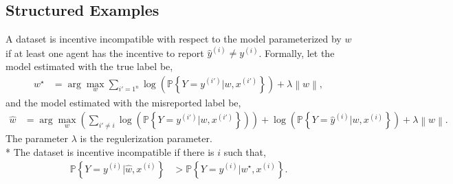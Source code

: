 \documentclass{article}
\begin{document}
\subsection{Structured Examples}
A dataset is incentive incompatible with respect to the model parameterized by $w $ if at least one agent has the incentive to report $\hat{y} ^{\left(i\right)} \neq  y^{\left(i\right)}$. Formally, let the model estimated with the true label be,
\begin{align*}
w^\star  &= \arg\displaystyle\max_{w} \displaystyle\sum_{i'=1^{n}} \log\left(\mathbb{P}\left\{Y = y^{\left(i'\right)} | w, x^{\left(i'\right)}\right\}\right) + \lambda \left\|w\right\|,
\end{align*}
and the model estimated with the misreported label be,
\begin{align*}
\hat{w} &= \arg\displaystyle\max_{w} \left(\displaystyle\sum_{i' \neq  i} \log\left(\mathbb{P}\left\{Y = y^{\left(i'\right)} | w, x^{\left(i'\right)}\right\}\right)\right) + \log\left(\mathbb{P}\left\{Y = \hat{y} ^{\left(i\right)} | w, x^{\left(i\right)}\right\}\right) + \lambda \left\|w\right\|.
\end{align*}
The parameter $\lambda$ is the regulerization parameter.
\\* The dataset is incentive incompatible if there is $i $ such that,
\begin{align*}
\mathbb{P}\left\{Y = y^{\left(i\right)} | \hat{w}, x^{\left(i\right)}\right\} &> \mathbb{P}\left\{Y = y^{\left(i\right)} | w^\star , x^{\left(i\right)}\right\}.
\end{align*}


\end{document}
